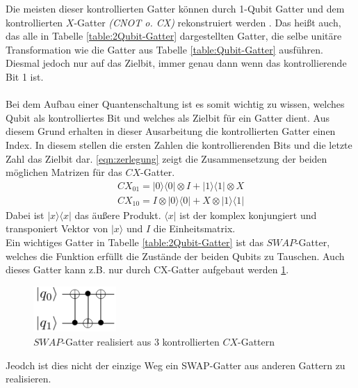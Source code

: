 Die meisten dieser kontrollierten Gatter k\"onnen durch 1-Qubit Gatter und dem kontrollierten $X$-Gatter \textit{(CNOT o. CX)} rekonstruiert werden \cite{Barenco_1995}. Das hei\ss t auch, das alle in Tabelle \ref{table:2Qubit-Gatter} dargestellten Gatter, die selbe unit\"are Transformation wie die Gatter aus Tabelle \ref{table:Qubit-Gatter} ausf\"uhren. Diesmal jedoch nur auf das Zielbit, immer genau dann wenn das kontrollierende Bit 1 ist. \\\\
Bei dem Aufbau einer Quantenschaltung ist es somit wichtig zu wissen, welches Qubit als kontrolliertes Bit und welches als Zielbit f\"ur ein Gatter dient. Aus diesem Grund erhalten in dieser Ausarbeitung die kontrollierten Gatter einen Index. In diesem stellen die ersten Zahlen die kontrollierenden Bits und die letzte Zahl das Zielbit dar. \ref{eqn:zerlegung} zeigt die Zusammensetzung der beiden m\"oglichen Matrizen f\"ur das $CX$-Gatter.
\begin{equation}\label{eqn:zerlegung}
\begin{aligned}
CX_{01} = |0\rangle\langle0|\otimes I +|1\rangle\langle1|\otimes X \\
CX_{10} = I \otimes |0\rangle\langle0|+X \otimes|1\rangle\langle1|
\end{aligned}
\end{equation}
Dabei ist $|x\rangle\langle x|$ das \"au\ss ere Produkt. $\langle x|$ ist der komplex konjungiert und transponiert Vektor von $|x\rangle$ und $I$ die Einheitsmatrix.\\
Ein wichtiges Gatter in Tabelle \ref{table:2Qubit-Gatter} ist das $SWAP$-Gatter, welches die Funktion erf\"ullt die Zust\"ande der beiden Qubits zu Tauschen. Auch dieses Gatter kann z.B. nur durch CX-Gatter aufgebaut werden \ref{fig:cnot2swap}.
\begin{figure}[h]
\centering
\includegraphics[width=0.28\textwidth]{figures/cnot2swap.pdf}
\caption{$SWAP$-Gatter realisiert aus 3 kontrollierten $CX$-Gattern}
\label{fig:cnot2swap}
\end{figure}
Jeodch ist dies nicht der einzige Weg ein SWAP-Gatter aus anderen Gattern zu realisieren.

